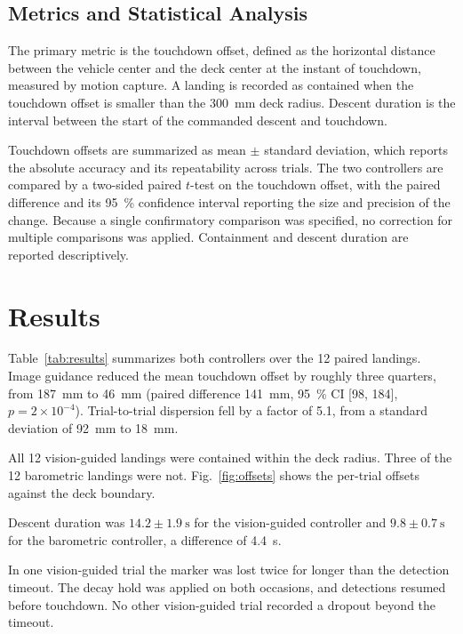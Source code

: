 \subsection{Metrics and Statistical Analysis}

The primary metric is the touchdown offset, defined as the horizontal distance between
the vehicle center and the deck center at the instant of touchdown, measured by motion
capture.
A landing is recorded as contained when the touchdown offset is smaller than the
\SI{300}{\milli\meter} deck radius. Descent duration is the interval between the start of
the commanded descent and touchdown.

Touchdown offsets are summarized as mean $\pm$ standard deviation, which reports the
absolute accuracy and its repeatability across trials. The two controllers are compared
by a two-sided paired $t$-test on the touchdown offset, with the paired difference and its
\SI{95}{\percent} confidence interval reporting the size and precision of the change.
Because a single confirmatory comparison was specified, no correction for multiple
comparisons was applied. Containment and descent duration are reported descriptively.

\section{Results}
\label{sec:results}

Table~\ref{tab:results} summarizes both controllers over the 12 paired landings. Image
guidance reduced the mean touchdown offset by roughly three quarters, from
\SI{187}{\milli\meter} to \SI{46}{\milli\meter} (paired difference
\SI{141}{\milli\meter}, \SI{95}{\percent} CI [98, 184], $p = 2\times10^{-4}$).
Trial-to-trial dispersion fell by a factor of 5.1, from a standard deviation of
\SI{92}{\milli\meter} to \SI{18}{\milli\meter}.

All 12 vision-guided landings were contained within the deck radius. Three of the 12
barometric landings were not. Fig.~\ref{fig:offsets} shows the per-trial offsets against
the deck boundary.

Descent duration was $14.2 \pm \SI{1.9}{\second}$ for the vision-guided controller and
$9.8 \pm \SI{0.7}{\second}$ for the barometric controller, a difference of
\SI{4.4}{\second}.

In one vision-guided trial the marker was lost twice for longer than the detection
timeout. The decay hold was applied on both occasions, and detections resumed before
touchdown. No other vision-guided trial recorded a dropout beyond the timeout.

